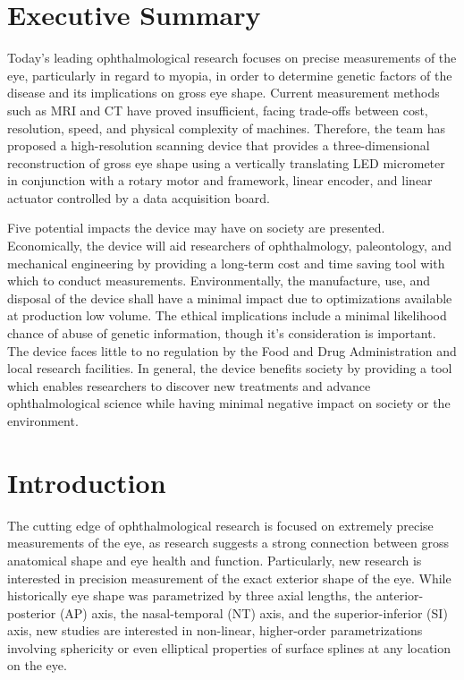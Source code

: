 \documentclass{article}
\begin{document}
 
 
\setcounter{tocdepth}{2}
\tableofcontents
\newpage
 
 
\section*{Executive Summary}
\label{sec:exec-summary}
 
Today's leading ophthalmological research focuses on precise
measurements of the eye, particularly in regard to myopia, in order to
determine genetic factors of the disease and its implications on gross
eye shape. Current measurement methods such as MRI and CT have proved
insufficient, facing trade-offs between cost, resolution, speed, and
physical complexity of machines. Therefore, the team has proposed a
high-resolution scanning device that provides a three-dimensional
reconstruction of gross eye shape using a vertically translating LED
micrometer in conjunction with a rotary motor and framework, linear
encoder, and linear actuator controlled by a data acquisition board.

Five potential impacts the device may have on society are
presented. Economically, the device will aid researchers of
ophthalmology, paleontology, and mechanical engineering by providing a
long-term cost and time saving tool with which to conduct
measurements. Environmentally, the manufacture, use, and disposal of the device
shall have a minimal impact due to optimizations available at
production low volume. The
ethical implications include a minimal likelihood chance of abuse of
genetic information, though it's consideration is important. The device faces
little to no regulation by the Food and Drug Administration and local
research facilities. In general, the device benefits society by
providing a tool which enables researchers to discover new treatments
and advance ophthalmological science while having minimal negative
impact on society or the environment.




\newpage
 
  
\section{Introduction}
\label{sec:Introduction}
 
The cutting edge of ophthalmological research is focused on extremely
precise measurements of the eye, as research suggests a strong
connection between gross anatomical shape and eye health and
function. Particularly, new research is interested in precision
measurement of the exact exterior shape of the
eye\cite{atchison04,zhou99:genes,zhou99:models,guggenheim04,wallman04}. While
historically eye shape was parametrized by three axial lengths, the
anterior-posterior (AP) axis, the nasal-temporal (NT) axis, and the
superior-inferior (SI) axis, new studies are interested in non-linear,
higher-order parametrizations involving sphericity or even elliptical
properties of surface splines at any location on the eye.
 
\end{document}

